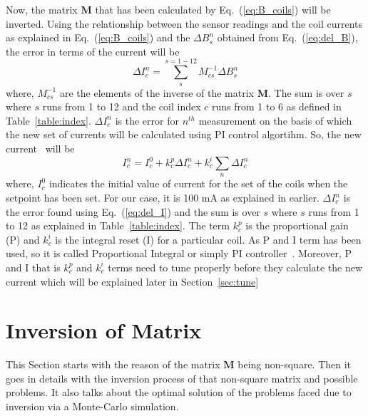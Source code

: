 Now, the matrix $\bm{M}$ that has been calculated by Eq.~(\ref{eq:B_coils}) will be inverted. Using the relationship between the sensor readings and the coil currents as explained in Eq.~(\ref{eq:B_coils}) and the $\Delta B_s^n$ obtained from Eq.~(\ref{eq:del_B}), the error in terms of the current  will be
\begin{equation}\label{eq:del_I}
    \Delta I_c^n =\sum_s^{s=1-12} M^{-1}_{cs} \Delta B_s^n
\end{equation}
where, $M^{-1}_{cs}$ are the elements of the inverse of the matrix $\bm{M}$. The sum is over $s$ where $s$ runs from 1 to 12 and the coil index $c$ runs from 1 to 6 as defined in Table~\ref{table:index}. $\Delta I_c^n$ is the error for $n^{th}$ measurement on the basis of which the new set of currents will be calculated using PI control algortihm. So, the new current~\cite{bea} will be
\begin{equation}\label{eq:I}
    I^n_c=I^0_c+k^p_c \Delta I_c^n+k^i_c\sum_n \Delta I_c^n
\end{equation}
where, $I^0_c$ indicates the initial value of current for the set of the coils when the setpoint has been set. For our case, it is 100 mA as explained in earlier. $\Delta I_c^n$ is the error found using Eq.~(\ref{eq:del_I}) and the sum is over $s$ where $s$ runs from 1 to 12 as explained in Table~\ref{table:index}. The term $k^p_c$ is the proportional gain (P) and $k^i_c$ is the integral reset (I) for a particular coil. As P and I term has been used, so it is called Proportional Integral or simply PI controller~\cite{pid}. Moreover, P and I that is $k^p_c$ and $k^i_c$ terms need to tune properly before they calculate the new current which will be explained later in Section~\ref{sec:tune}


\section{Inversion of Matrix}\label{sec:inv}

This Section starts with the reason of the matrix $\bm{M}$ being non-square. Then it goes in details with the inversion process of that non-square matrix and possible problems. It also talks about the optimal solution of the problems faced due to inversion via a Monte-Carlo simulation. 

